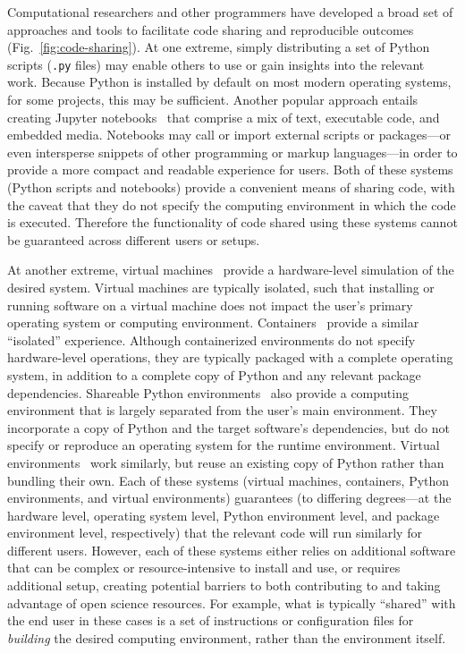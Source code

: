 \documentclass[preprint,12pt,a4paper]{elsarticle}
\begin{document}
Computational researchers and other programmers have de\-vel\-oped a
broad set of approaches and tools to facilitate code sharing and
reproducible outcomes (Fig.~\ref{fig:code-sharing}). At one extreme,
simply distributing a set of Python scripts (\texttt{.py} files) may
enable others to use or gain insights into the relevant work. Because
Python is installed by default on most modern operating systems, for
some projects, this may be sufficient. Another popular approach
entails creating Jupyter notebooks~\cite{KluyEtal16} that comprise a
mix of text, executable code, and embedded media. Notebooks may call
or import external scripts or packages---or even intersperse snippets
of other programming or markup lang\-uages---in order to provide a
more compact and readable experience for users. Both of these systems
(Python scripts and notebooks) provide a convenient means of sharing
code, with the caveat that they do not specify the computing
environment in which the code is executed. Therefore the functionality
of code shared using these systems cannot be guaranteed across
different users or setups.

At another extreme, virtual machines~\cite{Gold74, AltiEtal05, Rose99} provide
a hardware-level simulation of the desired system. Virtual machines are
typically isolated, such that installing or running software on a virtual
machine does not impact the user's primary operating system or computing
environment. Containers~\cite[e.g.,][]{Merk14, KurtEtal17} provide a similar
``isolated'' experience. Although containerized environments do not specify
hardware-level operations, they are typically packaged with a complete
operating system, in addition to a complete copy of Python and any relevant
package dependencies. Shareable Python environments~\cite[e.g.,][]{Anac12} also
provide a computing environment that is largely separated from the user's main
environment. They incorporate a copy of Python and the target software's
dependencies, but do not specify or reproduce an operating system for the
runtime environment. Virtual environments~\cite[e.g.,][]{BickEtal07, Eust19}
work similarly, but reuse an existing copy of Python rather than bundling their
own. Each of these systems (virtual machines, containers, Python environments,
and virtual environments) guarantees (to differing degrees---at the hardware
level, operating system level, Python environment level, and package
environment level, respectively) that the relevant code will run similarly for
different users. However, each of these systems either relies on additional
software that can be complex or resource-intensive to install and use, or
requires additional setup, creating potential barriers to both contributing to
and taking advantage of open science resources. For example, what is typically
``shared'' with the end user in these cases is a set of instructions or
configuration files for \textit{building} the desired computing environment,
rather than the environment itself.
\end{document}
